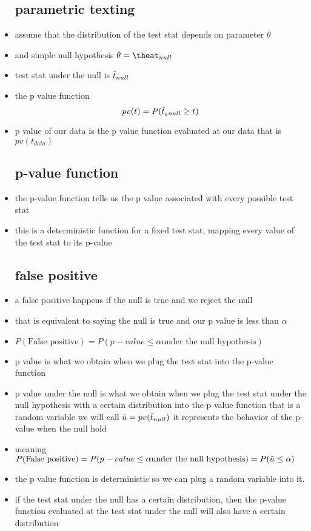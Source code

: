 \documentclass{article}
\begin{document}
\begin{itemize}
\subsection{parametric texting }
\item assume that the distribution of the test stat depends on parameter $\theta$
\item and simple null hypothesis $\theta=\theat_{null}$
\item test stat under the null is $\Tilde{t}_{null}$
\item the p value function $$pv(t)=P(\Tilde{t}_{_\theta{null}}\geq t)$$
\item p value of our data is the p value function evaluated at our data that is $pv(t_{data})$
\subsection{p-value function }
\item the p-value function tells us the p value associated with every possible test stat 
\item this is a deterministic function for a fixed test stat, mapping every value of the test stat to its p-value 
\subsection{false positive}
\item a false positive happens if the null is true and we reject the null 
\item that is equivalent to saying the null is true and our p value is less than $\alpha$
\item $P(\text{False positive})=P(p-value\leq \alpha \text{under the null hypothesis})$
\item p value is what we obtain when we plug the test stat into the p-value function 
\item p value under the null is what we obtain when we plug the test stat under the null hypothesis with a certain distribution into the p value function that is a random variable we will call $\Tilde{u}=pv(\Tilde{t}_{null})$ it represents the behavior of the p-value when the null hold
\item meaning $P(\text{False positive})=P(p-value\leq \alpha \text{under the null hypothesis})=P(\Tilde{u}\leq \alpha)$
\item the p value function is deterministic so we can plug a random variable into it. 
\item if the test stat under the null has a certain distribution, then the p-value function evaluated at the test stat under the null will also have a certain distribution 

\end{itemize}
\end{document}
